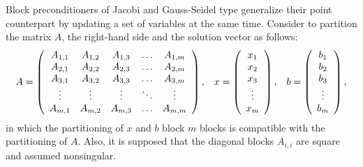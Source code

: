 Block preconditioners of Jacobi and Gauss-Seidel type generalize their point
counterpart by updating a set of variables at the same time. Consider
to partition the matrix $A$, the right-hand side and the solution vector
as follows:
\begin{equation}
\label{eq:partition}
A = 
\left(
\begin{array}{c c c c c}
A_{1,1} & A_{1,2} & A_{1,3} & \ldots & A_{1,m} \\
A_{2,1} & A_{2,2} & A_{2,3} & \ldots & A_{2,m} \\
A_{3,1} & A_{3,2} & A_{3,3} & \ldots & A_{3,m} \\
\vdots  & \vdots  & \vdots  & \ddots & \vdots  \\
A_{m,1} & A_{m,2} & A_{m,3} & \ldots & A_{m,m} \\
\end{array}
\right),
  \;\;\;
x = 
\left(
\begin{array}{c c c c c}
x_{1} \\
x_{2} \\
x_{3} \\
\vdots  \\
x_{m}
\end{array}
\right), \;\;\;
b = 
\left(
\begin{array}{c c c c c}
b_{1} \\
b_{2} \\
b_{3} \\
\vdots  \\
b_{m}
\end{array}
\right),
\end{equation}
in which the partitioning of $x$ and $b$ block $m$ blocks is compatible with the partitioning
of $A$. Also, it is supposed that the diagonal blocks $A_{i,i}$ are square
and assumed nonsingular.

